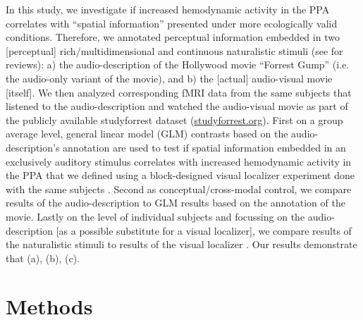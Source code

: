 \documentclass[english]{article}
\begin{document}

In this study, we investigate if increased hemodynamic activity in the PPA
correlates with ``spatial information'' presented under more ecologically valid
conditions.
Therefore, we annotated perceptual information embedded in two [perceptual]
rich/multidimensional and continuous naturalistic stimuli (see
\citep{hamilton2018revolution, hasson2008neurocinematics,
sonkusare2019naturalistic} for reviews):
a) the audio-description of the Hollywood movie ``Forrest Gump'' (i.e. the
audio-only variant of the movie), and
b) the [actual] audio-visual movie [itself].
We then analyzed corresponding fMRI data from the same subjects that listened
to the audio-description and watched the audio-visual movie as part of the
publicly available studyforrest dataset
(\href{http://www.studyforrest.org}{studyforrest.org}).
First on a group average level, general linear model (GLM) contrasts based on
the audio-description's annotation are used to test if spatial information
embedded in an exclusively auditory stimulus correlates with increased
hemodynamic activity in the PPA that we defined using a block-designed visual
localizer experiment done with the same subjects \citep{sengupta2016extension}.
Second as conceptual/cross-modal control, we compare results of the
audio-description to GLM results based on the annotation of the movie.
Lastly on the level of individual subjects and focussing on the
audio-description [as a possible substitute for a visual localizer], we compare
results of the naturalistic stimuli to results of the visual localizer
\citep{sengupta2016extension}.
 Our results demonstrate that (a), (b), (c).



\section{Methods}
\end{document}
